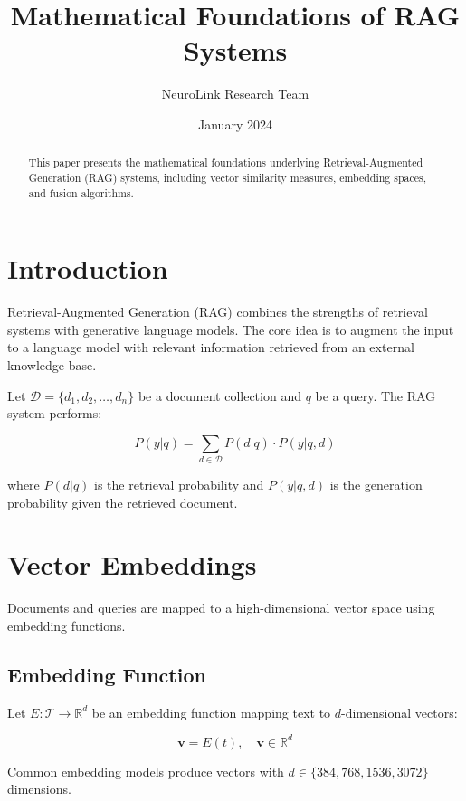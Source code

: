 \documentclass{article}
\title{Mathematical Foundations of RAG Systems}
\author{NeuroLink Research Team}
\date{January 2024}
\begin{document}
\maketitle

\begin{abstract}
This paper presents the mathematical foundations underlying Retrieval-Augmented Generation (RAG) systems, including vector similarity measures, embedding spaces, and fusion algorithms.
\end{abstract}

\section{Introduction}

Retrieval-Augmented Generation (RAG) combines the strengths of retrieval systems with generative language models. The core idea is to augment the input to a language model with relevant information retrieved from an external knowledge base.

Let $\mathcal{D} = \{d_1, d_2, \ldots, d_n\}$ be a document collection and $q$ be a query. The RAG system performs:

\begin{equation}
P(y|q) = \sum_{d \in \mathcal{D}} P(d|q) \cdot P(y|q, d)
\end{equation}

where $P(d|q)$ is the retrieval probability and $P(y|q,d)$ is the generation probability given the retrieved document.

\section{Vector Embeddings}

Documents and queries are mapped to a high-dimensional vector space using embedding functions.

\subsection{Embedding Function}

Let $E: \mathcal{T} \rightarrow \mathbb{R}^d$ be an embedding function mapping text to $d$-dimensional vectors:

\begin{equation}
\mathbf{v} = E(t), \quad \mathbf{v} \in \mathbb{R}^d
\end{equation}

Common embedding models produce vectors with $d \in \{384, 768, 1536, 3072\}$ dimensions.
\end{document}
